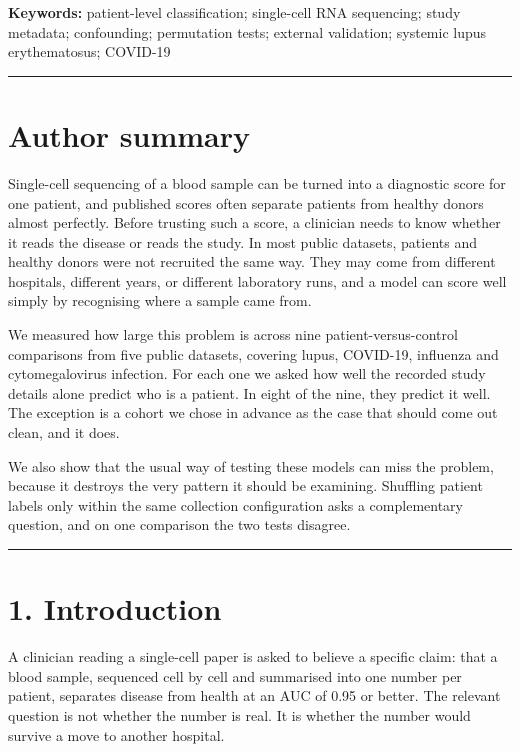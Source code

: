 \textbf{Keywords:} patient-level classification; single-cell RNA sequencing; study metadata; confounding; permutation tests; external validation; systemic lupus erythematosus; COVID-19

\begin{center}\rule{0.5\linewidth}{0.5pt}\end{center}

\section{Author summary}\label{author-summary}

Single-cell sequencing of a blood sample can be turned into a diagnostic score for one patient, and published scores often separate patients from healthy donors almost perfectly. Before trusting such a score, a clinician needs to know whether it reads the disease or reads the study. In most public datasets, patients and healthy donors were not recruited the same way. They may come from different hospitals, different years, or different laboratory runs, and a model can score well simply by recognising where a sample came from.

We measured how large this problem is across nine patient-versus-control comparisons from five public datasets, covering lupus, COVID-19, influenza and cytomegalovirus infection. For each one we asked how well the recorded study details alone predict who is a patient. In eight of the nine, they predict it well. The exception is a cohort we chose in advance as the case that should come out clean, and it does.

We also show that the usual way of testing these models can miss the problem, because it destroys the very pattern it should be examining. Shuffling patient labels only within the same collection configuration asks a complementary question, and on one comparison the two tests disagree.

\begin{center}\rule{0.5\linewidth}{0.5pt}\end{center}

\section{1. Introduction}\label{introduction}

A clinician reading a single-cell paper is asked to believe a specific claim: that a blood sample, sequenced cell by cell and summarised into one number per patient, separates disease from health at an AUC of 0.95 or better. The relevant question is not whether the number is real. It is whether the number would survive a move to another hospital.

